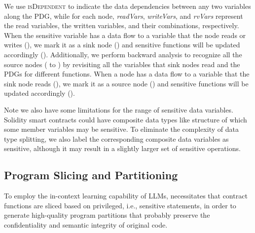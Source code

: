 We use \textsc{isDependent} to indicate the data dependencies between any two variables along the PDG, while for each node, \textit{readVars}, \textit{writeVars}, and \textit{rvVars} represent the read variables, the written variables, and their combinations, respectively.
When the sensitive variable has a data flow to a variable that the node reads or writes (), 
we mark it as a sink node () and sensitive functions will be updated accordingly ().
Additionally, we perform backward analysis to recognize all the source nodes ( to ) by revisiting all the variables that sink nodes read and the PDGs for different functions.
When a node has a data flow to a variable that the sink node reads (),
we mark it as a source node () and sensitive functions will be updated accordingly ().

Note we also have some limitations for the range of sensitive data variables.
Solidity smart contracts could have composite data types like structure of which some member variables may be sensitive.
To eliminate the complexity of data type splitting, we also label the corresponding composite data variables as sensitive, although it may result in a slightly larger set of sensitive operations. 


\subsection{Program Slicing and Partitioning}



To employ the in-context learning capability of LLMs, \tool necessitates that contract functions are sliced based on privileged, i.e., sensitive statements, in order to generate high-quality program partitions that probably preserve the confidentiality and semantic integrity of original code.

